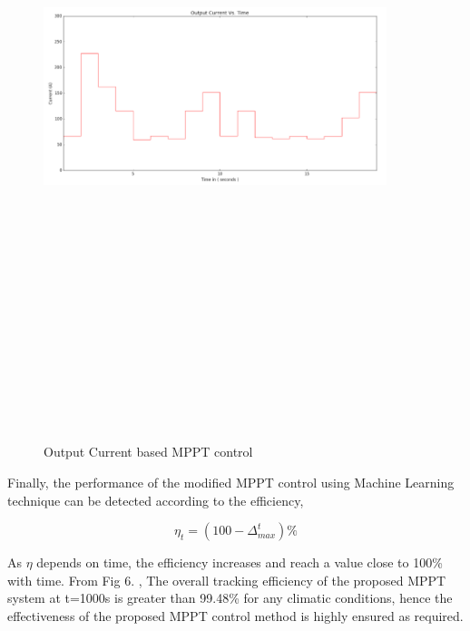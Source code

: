 \begin{center}
\begin{figure}
\includegraphics[width=10cm,height=20cm,keepaspectratio]{10.png}
\caption {Output Current based MPPT control}
\label{Fig:10}    
\end{figure}
\end{center}

Finally, the performance of the modified MPPT control using Machine Learning technique can be detected according to the efficiency,

\begin{equation}
\eta_t  = (100 - \Delta_{max}^t)\%
\end{equation}

As $\eta$ depends on time, the efficiency increases and reach a value close to 100\% with time. From Fig 6. , The overall tracking efficiency of the proposed MPPT system at t=1000s is greater than 99.48\% for any climatic conditions, hence the effectiveness of the proposed MPPT control method is highly ensured as required.

